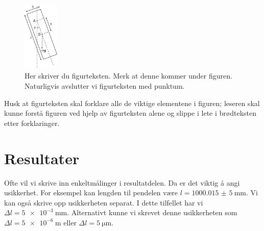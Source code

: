 \begin{figure}[tbp] 
\centering %
\includegraphics[width=0.15\textwidth]{pendel-oppdatert.pdf}
\caption{Her skriver du figurteksten. Merk at denne kommer under figuren. Naturligvis avslutter vi figurteksten med punktum.}
\label{fig:pendel} %
\end{figure}

Husk at figurteksten skal forklare alle de viktige elementene i figuren; leseren skal kunne forstå figuren ved hjelp av figurteksten alene og slippe i lete i brødteksten etter forklaringer. 


\section{Resultater}
Ofte vil vi skrive inn enkeltmålinger i resultatdelen. Da er det viktig å angi usikkerhet. For eksempel kan lengden til pendelen være $l=\SI{1000,015(5)}{\milli\metre}$. 
Vi kan også skrive opp usikkerheten separat. I dette tilfellet har vi $\Delta l=\SI{5e-3}{\milli\metre}$. Alternativt kunne vi skrevet denne usikkerheten som $\Delta l=\SI{5e-6}{\metre}$ eller $\Delta l=\SI{5}{\micro\metre}$.

